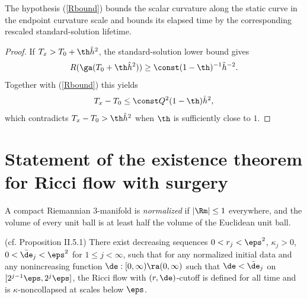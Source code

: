 \begin{remark}
  \label{rem:kl-technical-estimate-estimates-standard-solutions}
The hypothesis (\ref{Rbound}) bounds the scalar curvature along the static
curve in the endpoint curvature scale and bounds its elapsed time by the
corresponding rescaled standard-solution lifetime.
\end{remark}
\begin{proof}
\sketch If $T_x>T_0+\th\hat h^2$, the standard-solution lower bound gives
\[
R(\ga(T_0+\th\hat h^2))\geq\const(1-\th)^{-1}\hat h^{-2}.
\]
Together with (\ref{Rbound}) this yields
\[
T_x-T_0\leq\const Q^2(1-\th)\hat h^2,
\]
which contradicts $T_x-T_0> \th\hat h^2$ when $\th$ is sufficiently close
to $1$.
\end{proof}

\section{Statement of the existence theorem for Ricci flow with surgery}
 \label{II.5}

\begin{definition}
  \label{def:kl-statement-existence-theorem-ricci-flow-surgery-normalized-definition}

A compact Riemannian $3$-manifold is {\em normalized} if
$|\Rm|\leq 1$ everywhere, and the volume of every unit
ball is at least half the volume of the Euclidean unit
ball.
\end{definition}

\begin{proposition}
  \label{prop:kl-statement-existence-theorem-ricci-flow-surgery-monotonicity-kappa-solutions}
(cf. Proposition II.5.1)
\label{surgeryflowexists}
There exist decreasing sequences $0<r_j<\eps^2$,
$\kappa_j>0$, $0<\bar\de_j<\eps^2$ for $1\leq j<\infty$,
such that for any normalized initial data and any nonincreasing function
$\de:[0,\infty)\ra(0,\infty)$ such that $\de<\bar\de_j$
on $[2^{j-1}\eps,2^j\eps]$, the Ricci flow with $(r,\de)$-cutoff
is defined for all time and is $\kappa$-noncollapsed
at scales below $\eps$.
\end{proposition}

